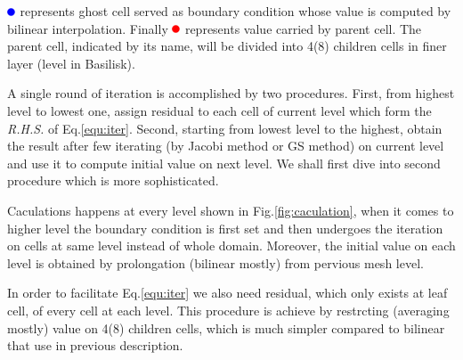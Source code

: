 \documentclass[a4paper]{article}
\newcommand{\prolong}{\tikz \fill[blue] (3pt,3pt) circle (3pt);}
\newcommand{\rest}{\tikz \fill[red] (3pt,3pt) circle (3pt);}
\begin{document}
$\prolong$ represents ghost cell served as boundary condition whose value is computed by bilinear interpolation. Finally $\rest$ represents value carried by parent cell. The parent cell, indicated by its name, will be divided into 4(8) children cells in finer layer (level in Basilisk).\cite{van2018towards}\par
A single round of iteration is accomplished by two procedures. First, from highest level to lowest one, assign residual to each cell of current level which form the \emph{R.H.S.} of Eq.\ref{equ:iter}. Second, starting from lowest level to the highest, obtain the result after few iterating (by Jacobi method or GS method) on current level and use it to compute initial value on next level. We shall first dive into second procedure which is more sophisticated.\par
Caculations happens at every level shown in Fig.\ref{fig:caculation}, when it comes to higher level the boundary condition is first set and then undergoes the iteration on cells at same level instead of whole domain. Moreover, the initial value on each level is obtained by prolongation (bilinear mostly) from pervious mesh level.\par
In order to facilitate Eq.\ref{equ:iter} we also need residual, which only exists at leaf cell, of every cell at each level. This procedure is achieve by restrcting\cite{popinet2015quadtree} (averaging mostly) value on 4(8) children cells, which is much simpler compared to bilinear that use in previous description.\par 
\end{document}
